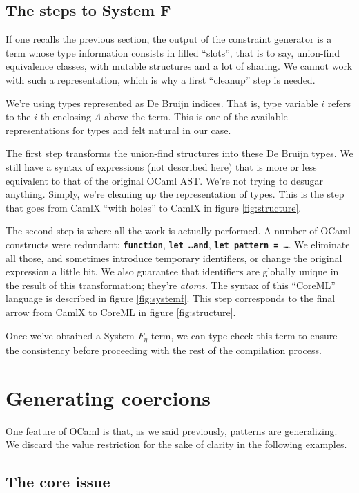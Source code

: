 \documentclass[10pt,a4paper,twoside,titlepage,twocolumn]{article}
\newcommand{\code}[1]{\textbf{\texttt{#1}}}
\begin{document}
\subsection{The steps to System F}

If one recalls the previous section, the output of the constraint generator is a
term whose type information consists in filled ``slots'', that is to say,
union-find equivalence classes, with mutable structures and a lot of sharing. We
cannot work with such a representation, which is why a first ``cleanup'' step is
needed.

We're using types represented as De Bruijn indices. That is, type variable
$i$ refers to the $i$-th enclosing $\Lambda$ above the term. This is one of the
available representations for types and felt natural in our case.

The first step transforms the union-find structures into these De Bruijn types.
We still have a syntax of expressions (not described here) that is more or less
equivalent to that of the original OCaml AST. We're not trying to desugar
anything. Simply, we're cleaning up the representation of types. This is the
step that goes from CamlX ``with holes'' to CamlX in figure \ref{fig:structure}.

The second step is where all the work is actually performed. A number of OCaml
constructs were redundant: \code{function}, \code{let \dots\;and}, \code{let
pattern = \dots}. We eliminate all those, and sometimes introduce temporary
identifiers, or change the original expression a little bit. We also guarantee
that identifiers are globally unique in the result of this transformation;
they're \emph{atoms}. The syntax of this ``CoreML'' language is described in
figure \vref{fig:systemf}. This step corresponds to the final arrow from CamlX
to CoreML in figure \ref{fig:structure}.

Once we've obtained a System $F_\eta$ term, we can type-check this term to
ensure the consistency before proceeding with the rest of the compilation
process.

\section{Generating coercions}

One feature of OCaml is that, as we said previously, patterns are generalizing.
We discard the value restriction for the sake of clarity in the following
examples.

\subsection{The core issue}
\end{document}
